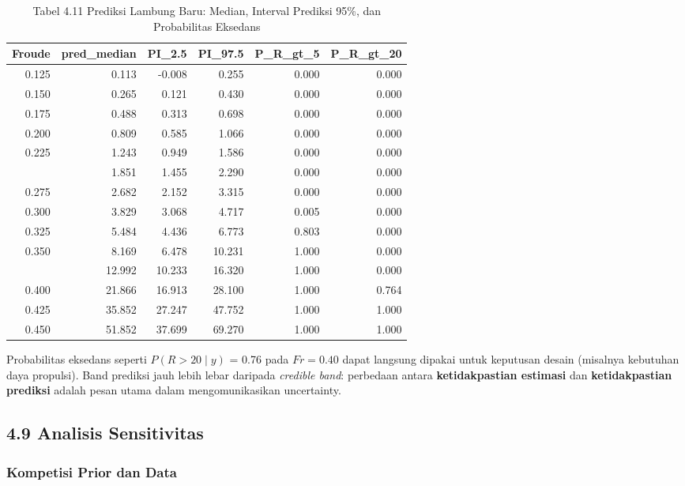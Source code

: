 \documentclass[
]{article}
\begin{document}
\begin{longtable}[t]{rrrrrr}
\caption{\label{tab:tabel_pred}Tabel 4.11 Prediksi Lambung Baru: Median, Interval Prediksi 95\%, dan Probabilitas Eksedans}\\
\toprule
Froude & pred\_median & PI\_2.5 & PI\_97.5 & P\_R\_gt\_5 & P\_R\_gt\_20\\
\midrule
0.125 & 0.113 & -0.008 & 0.255 & 0.000 & 0.000\\
0.150 & 0.265 & 0.121 & 0.430 & 0.000 & 0.000\\
0.175 & 0.488 & 0.313 & 0.698 & 0.000 & 0.000\\
0.200 & 0.809 & 0.585 & 1.066 & 0.000 & 0.000\\
0.225 & 1.243 & 0.949 & 1.586 & 0.000 & 0.000\\
\addlinespace
0.250 & 1.851 & 1.455 & 2.290 & 0.000 & 0.000\\
0.275 & 2.682 & 2.152 & 3.315 & 0.000 & 0.000\\
0.300 & 3.829 & 3.068 & 4.717 & 0.005 & 0.000\\
0.325 & 5.484 & 4.436 & 6.773 & 0.803 & 0.000\\
0.350 & 8.169 & 6.478 & 10.231 & 1.000 & 0.000\\
\addlinespace
0.375 & 12.992 & 10.233 & 16.320 & 1.000 & 0.000\\
0.400 & 21.866 & 16.913 & 28.100 & 1.000 & 0.764\\
0.425 & 35.852 & 27.247 & 47.752 & 1.000 & 1.000\\
0.450 & 51.852 & 37.699 & 69.270 & 1.000 & 1.000\\
\bottomrule
\end{longtable}
\endgroup{}

Probabilitas eksedans seperti \(P(R>20\mid y)\) = 0.76 pada
\(Fr = 0.40\) dapat langsung dipakai untuk keputusan desain (misalnya
kebutuhan daya propulsi). Band prediksi jauh lebih lebar daripada
\emph{credible band}: perbedaan antara \textbf{ketidakpastian estimasi}
dan \textbf{ketidakpastian prediksi} adalah pesan utama dalam
mengomunikasikan uncertainty.

\subsection{4.9 Analisis Sensitivitas}\label{analisis-sensitivitas}

\subsubsection{Kompetisi Prior dan Data}\label{kompetisi-prior-dan-data}
\end{document}
